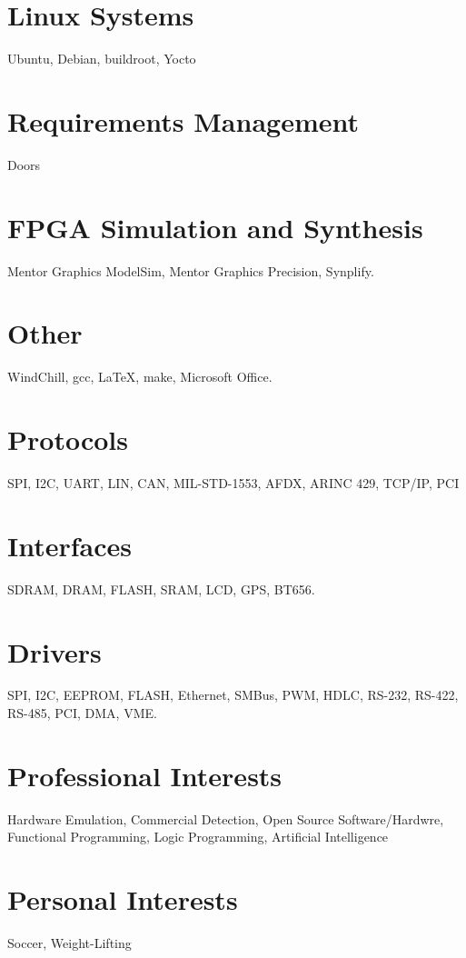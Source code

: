 \documentclass[print]{template/friggeri-cv} %
\begin{document}
\begin{aside2} %
\section{Linux Systems}
Ubuntu, Debian, buildroot, Yocto
\section{Requirements Management}
Doors
\section{FPGA Simulation and Synthesis}
Mentor Graphics ModelSim, Mentor Graphics Precision, Synplify.
\section{Other}
WindChill, gcc, LaTeX, make, Microsoft Office.
\section{Protocols}
SPI, I2C, UART, LIN, CAN, MIL-STD-1553, AFDX, ARINC 429, TCP/IP, PCI
\section{Interfaces}
SDRAM, DRAM, FLASH, SRAM, LCD, GPS, BT656.
\section{Drivers}
SPI, I2C, EEPROM, FLASH, Ethernet, SMBus, PWM, HDLC, RS-232, RS-422, RS-485, PCI, DMA, VME.
\section{Professional Interests}
Hardware Emulation, Commercial Detection, Open Source Software/Hardwre, Functional Programming, Logic Programming, Artificial Intelligence
\section{Personal Interests}
Soccer, Weight-Lifting
\end{aside2}
\end{document}
